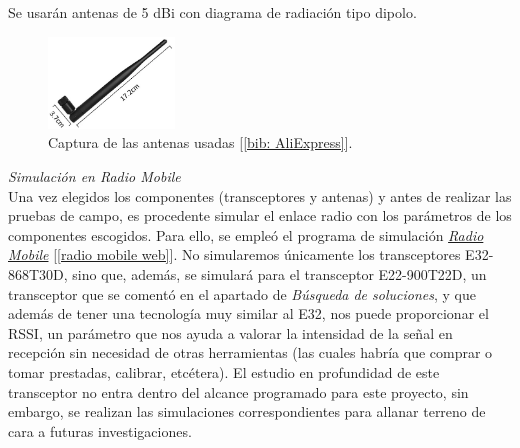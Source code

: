 \documentclass[12pt]{article}
\begin{document}
	\noindent Se usarán antenas de 5 dBi con diagrama de radiación tipo dipolo.\\
	
	\begin{figure}[h]
		\begin{center}
			\includegraphics[width=0.3\textwidth]{img/antena_5dbi.png}
			\caption{Captura de las antenas usadas [\ref{bib: AliExpress}].}
			\label{Captura antenas 5dbi}
		\end{center}
	\end{figure}
	
	\noindent \textit{Simulación en Radio Mobile}\\
	
	\noindent Una vez elegidos los componentes (transceptores y antenas) y antes de realizar las pruebas de campo, es procedente simular el enlace radio con los parámetros de los componentes escogidos. Para ello, se empleó el programa de simulación \href{https://www.ve2dbe.com/english1.html}{\textit{Radio Mobile}} [\ref{radio mobile web}]. No simularemos únicamente los transceptores E32-868T30D, sino que, además, se simulará para el transceptor E22-900T22D, un transceptor que se comentó en el apartado de \textit{Búsqueda de soluciones}, y que además de tener una tecnología muy similar al E32, nos puede proporcionar el RSSI, un parámetro que nos ayuda a valorar la intensidad de la señal en recepción sin necesidad de otras herramientas (las cuales habría que comprar o tomar prestadas, calibrar, etcétera). El estudio en profundidad de este transceptor no entra dentro del alcance programado para este proyecto, sin embargo, se realizan las simulaciones correspondientes para allanar terreno de cara a futuras investigaciones.
	
\end{document}
